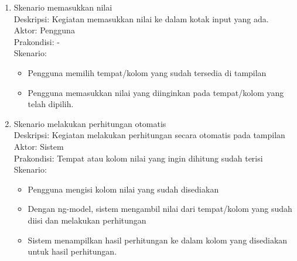 	\begin{enumerate}
		\item Skenario memasukkan nilai\\
			Deskripsi: Kegiatan memasukkan nilai ke dalam kotak input yang ada.\\
			Aktor: Pengguna\\
			Prakondisi: - \\
			Skenario:
			\begin{itemize}
				\item Pengguna memilih tempat/kolom yang sudah tersedia di tampilan
				\item Pengguna memasukkan nilai yang diinginkan pada tempat/kolom yang telah dipilih.
			\end{itemize}
		\item Skenario melakukan perhitungan otomatis\\
			Deskripsi: Kegiatan melakukan perhitungan secara otomatis pada tampilan\\
			Aktor: Sistem\\
			Prakondisi: Tempat atau kolom nilai yang ingin dihitung sudah terisi\\
			Skenario:
			\begin{itemize}
				\item Pengguna mengisi kolom nilai yang sudah disediakan
				\item Dengan ng-model, sistem mengambil nilai dari tempat/kolom yang sudah diisi dan melakukan perhitungan
				\item Sistem menampilkan hasil perhitungan ke dalam kolom yang disediakan untuk hasil perhitungan.
			\end{itemize}
	\end{enumerate}
	